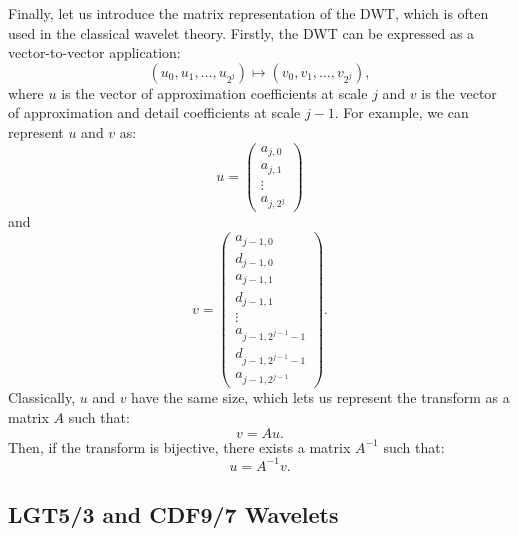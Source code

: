 Finally, let us introduce the matrix representation of the DWT, which is often used in the classical wavelet theory.
Firstly, the DWT can be expressed as a vector-to-vector application:
\begin{equation}
(u_0, u_1, \ldots, u_{2^j}) \mapsto (v_0, v_1, \ldots, v_{2^{j}}),
\end{equation}
where \( u \) is the vector of approximation coefficients at scale \( j \) and \( v \) is the vector of approximation and detail coefficients at scale \( j-1 \).
For example, we can represent $u$ and $v$ as:
\begin{equation}
u=\begin{pmatrix} a_{j,0}\\ a_{j,1}\\ \vdots\\ a_{j,2^{j}} \end{pmatrix}
\end{equation}
and
\begin{equation}
\label{eq:vector_v}
v=\begin{pmatrix} a_{j-1,0}\\ d_{j-1,0}\\ a_{j-1,1}\\ d_{j-1,1}\\ \vdots\\ a_{j-1,2^{j-1}-1}\\ d_{j-1,2^{j-1}-1}\\ a_{j-1,2^{j-1}} \end{pmatrix}.
\end{equation}
Classically, $u$ and $v$ have the same size, which lets us represent the transform as a matrix \( A \) such that:
\begin{equation}
\label{eq:DWT_matrix_form}
v=Au.
\end{equation}
Then, if the transform is bijective, there exists a matrix \( A^{-1} \) such that:
\begin{equation}
\label{eq:DWT_matrix_form_inverse}
u=A^{-1}v.
\end{equation}

\subsection{LGT5/3 and CDF9/7 Wavelets} \label{sec:LGT5_3_CDF9_7}

